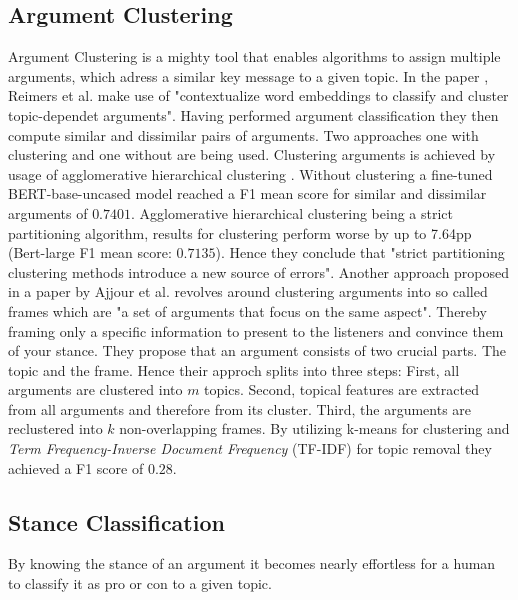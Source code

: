 \subsection{Argument Clustering}
Argument Clustering is a mighty tool that enables algorithms to assign multiple arguments, which adress a similar
key message to a given topic. In the paper \cite{reimers2019classification}, Reimers et al. make use of 
"contextualize word embeddings to classify and cluster topic-dependet arguments". Having performed argument
classification they then compute similar and dissimilar pairs of arguments. Two approaches one with clustering
and one without are being used. 
Clustering arguments is achieved by usage of agglomerative hierarchical clustering \cite{day1984efficient}. 
Without clustering a fine-tuned BERT-base-uncased model reached a F1 mean score for similar and dissimilar
arguments of $0.7401$. 
Agglomerative hierarchical clustering being a strict partitioning algorithm, results for clustering perform
worse by up to 7.64pp (Bert-large F1 mean score: $0.7135$). Hence they conclude that "strict partitioning 
clustering methods introduce a new source of errors".
Another approach proposed in a paper \cite{ajjour2019modeling} by Ajjour et al. revolves around clustering 
arguments into so called frames which are "a set of arguments that focus on the same aspect". 
Thereby framing \cite{entman1993framing} only a specific information to present to the listeners and convince 
them of your stance.
They propose that an argument consists of two crucial parts. The topic and the frame.
Hence their approch splits into three steps: First, all arguments are clustered into $m$ topics. Second,
topical features are extracted from all arguments and therefore from its cluster. Third, the arguments are 
reclustered into $k$ non-overlapping frames. By utilizing k-means \cite{hartigan1979ak} for clustering
and \textit{Term Frequency-Inverse Document Frequency} (TF-IDF) for topic removal they achieved a F1 score of 
$0.28$.


\subsection{Stance Classification}
By knowing the stance of an argument it becomes nearly effortless for a human to classify it as pro or con 
to a given topic. 
